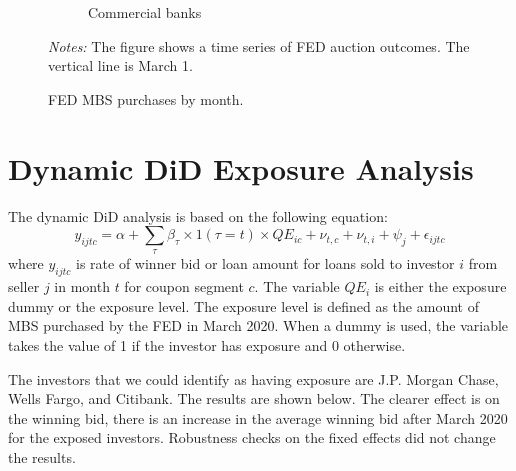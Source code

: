 \documentclass[11pt,a4paper]{article}
\begin{document}
\begin{figure}[h]
\begin{subfigure}[b]{0.7\textwidth}
        \caption{ Commercial banks } 
       \end{subfigure}
       \caption{FED MBS purchases by month.}\label{fig:fed_mbs_amount_by_month}
     \begin{minipage}{\textwidth}
        \footnotesize{\textit{Notes:} The figure shows a time series of FED auction outcomes. The vertical line is March 1.  } 
        \end{minipage}
  \end{figure}



\pagebreak

\section{Dynamic DiD Exposure Analysis}

The dynamic DiD analysis is based on the following equation:
$$y_{ijtc} = \alpha + \sum_\tau \beta_\tau \times 1({\tau}=t)  \times QE_{ic} + \nu_{t,c} + \nu_{t,i} +\psi_{j} + \epsilon_{ijtc}$$
where $y_{ijtc}$ is rate of winner bid or loan amount for loans sold to investor $i$ from seller $j$ in month $t$ for coupon segment $c$. The variable $QE_{i}$ is either the exposure dummy or the exposure level. The exposure level is defined as the amount of MBS purchased by the FED in March 2020. When a dummy is used, the variable takes the value of 1 if the investor has exposure and 0 otherwise. 

The investors that we could identify as having exposure are J.P. Morgan Chase, Wells Fargo, and Citibank. The results are shown below.  The clearer effect is on the winning bid, there is an increase in the average winning bid after March 2020 for the exposed investors. Robustness checks on the fixed effects did not change the results.
\end{document}

